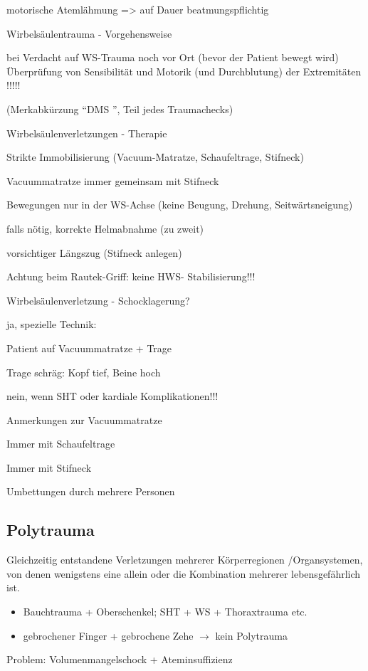 \documentclass{article}
\begin{document}
motorische Ateml\"ahmung ={\textgreater} auf Dauer  beatmungspflichtig

Wirbels\"aulentrauma -  Vorgehensweise

bei Verdacht  auf WS-Trauma  noch vor Ort  (bevor  der Patient bewegt 
wird) \"Uberpr\"ufung von Sensibilit\"at  und Motorik (und
Durchblutung) der Extremit\"aten !!!!!

(Merkabk\"urzung {\textquotedblleft}DMS {\textquotedblright}, Teil jedes
 Traumachecks)

Wirbels\"aulenverletzungen - Therapie

Strikte Immobilisierung (Vacuum-Matratze, Schaufeltrage, Stifneck)

Vacuummatratze immer gemeinsam mit  Stifneck

Bewegungen nur in der WS-Achse (keine  Beugung, Drehung,
Seitw\"artsneigung)

falls n\"otig, korrekte Helmabnahme (zu  zweit)

vorsichtiger L\"angszug (Stifneck anlegen)

Achtung beim Rautek-Griff: keine HWS- Stabilisierung!!!

Wirbels\"aulenverletzung -  Schocklagerung?

ja, spezielle Technik:

Patient auf Vacuummatratze + Trage

Trage schr\"ag: Kopf tief, Beine hoch

nein, wenn SHT oder kardiale  Komplikationen!!!

Anmerkungen zur Vacuummatratze

Immer mit Schaufeltrage

Immer mit Stifneck

Umbettungen durch mehrere Personen

\subsection{Polytrauma}
Gleichzeitig entstandene Verletzungen mehrerer K\"orperregionen
/Organsystemen, von  denen wenigstens eine allein oder die Kombination
mehrerer lebensgef\"ahrlich  ist.

\begin{itemize}
\item Bauchtrauma + Oberschenkel; SHT + WS + Thoraxtrauma etc.

\item gebrochener Finger + gebrochene Zehe ${\rightarrow}$ kein
Polytrauma

\end{itemize}
Problem:  Volumenmangelschock +  Ateminsuffizienz
\end{document}
